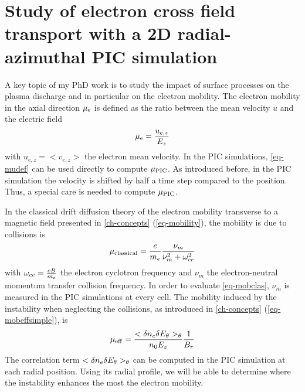 
\section{Study of electron cross field transport with a 2D radial-azimuthal PIC simulation}
  \label{sec-transport}
  

  A key topic of my PhD work is to study the impact of surface processes on the plasma discharge and in particular on the electron mobility.   
  The electron mobility in the axial direction $\mu_{\mathrm{e}}$ is defined as the ratio between the mean velocity $u$ and the electric field
  \begin{equation} \label{eq-mudef}
    \mu_{\mathrm{e}} = \frac{u_{e,z}}{E_z}
  \end{equation}
  with $u_{e,z}=<v_{e,z}>$ the electron mean velocity.
  In the \ac{PIC} simulations, \cref{eq-mudef} can be used directly to compute $\mu_{\mathrm{PIC}}$.
  As introduced before, in the \ac{PIC} simulation the velocity is shifted by half a time step compared to the position.
  Thus, a special care is needed to compute $\mu_{\mathrm{PIC}}$.
  
  In the classical drift diffusion theory of the electron mobility transverse to a magnetic field presented in \cref{ch-concepts}  (\cref{eq-mobility}), the mobility is due to collisions is 
  \begin{equation} \label{eq-mobclas}
    \mu_{\mathrm{classical}} = \frac{e}{m_e} \frac{\nu_m}{\nu_m^2 + \omega_{ce}^2}
  \end{equation}
  with $\omega_{ce}=\frac{e B}{m_e}$ the electron cyclotron frequency and $\nu_m$ the electron-neutral momentum transfer collision frequency.
  In order to evaluate \cref{eq-mobclas},  $\nu_m$ is measured in the \ac{PIC} simulations at every cell.
  The mobility induced by the instability when neglecting the collisions, as introduced in \cref{ch-concepts} (\cref{eq-mobeffsimple}), is 
  \begin{equation} \label{eq-eq_mobeffsimple_two}
      \mu_{\mathrm{eff}} = \frac{< \delta n_e \delta E_{\theta} >_{\theta} }{n_0 E_z}   \frac{1}{B_r}
  \end{equation}
  The correlation term $< \delta n_e \delta E_{\theta} >_{\theta}$ can be computed in the \ac{PIC} simulation at each radial position.
  Using its radial profile, we will be able to determine where the instability enhances the most the electron mobility.
  
